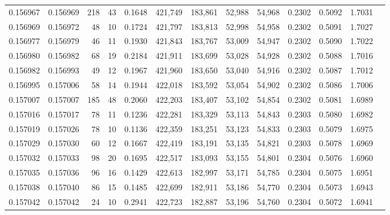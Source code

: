 \begin{tabular}{rrrrrrrrrrrrr}
0.156967 & 0.156969 &   218 &  43 &                                     0.1648 & 421,749 & 183,861 &  52,988 &  54,968 & 0.2302 & 0.5092 & 1.7031 \\
0.156969 & 0.156972 &    48 &  10 &                                     0.1724 & 421,797 & 183,813 &  52,998 &  54,958 & 0.2302 & 0.5091 & 1.7027 \\
0.156977 & 0.156979 &    46 &  11 &                                     0.1930 & 421,843 & 183,767 &  53,009 &  54,947 & 0.2302 & 0.5090 & 1.7022 \\
0.156980 & 0.156982 &    68 &  19 &                                     0.2184 & 421,911 & 183,699 &  53,028 &  54,928 & 0.2302 & 0.5088 & 1.7016 \\
0.156982 & 0.156993 &    49 &  12 &                                     0.1967 & 421,960 & 183,650 &  53,040 &  54,916 & 0.2302 & 0.5087 & 1.7012 \\
0.156995 & 0.157006 &    58 &  14 &                                     0.1944 & 422,018 & 183,592 &  53,054 &  54,902 & 0.2302 & 0.5086 & 1.7006 \\
0.157007 & 0.157007 &   185 &  48 &                                     0.2060 & 422,203 & 183,407 &  53,102 &  54,854 & 0.2302 & 0.5081 & 1.6989 \\
0.157016 & 0.157017 &    78 &  11 &                                     0.1236 & 422,281 & 183,329 &  53,113 &  54,843 & 0.2303 & 0.5080 & 1.6982 \\
0.157019 & 0.157026 &    78 &  10 &                                     0.1136 & 422,359 & 183,251 &  53,123 &  54,833 & 0.2303 & 0.5079 & 1.6975 \\
0.157029 & 0.157030 &    60 &  12 &                                     0.1667 & 422,419 & 183,191 &  53,135 &  54,821 & 0.2303 & 0.5078 & 1.6969 \\
0.157032 & 0.157033 &    98 &  20 &                                     0.1695 & 422,517 & 183,093 &  53,155 &  54,801 & 0.2304 & 0.5076 & 1.6960 \\
0.157035 & 0.157036 &    96 &  16 &                                     0.1429 & 422,613 & 182,997 &  53,171 &  54,785 & 0.2304 & 0.5075 & 1.6951 \\
0.157038 & 0.157040 &    86 &  15 &                                     0.1485 & 422,699 & 182,911 &  53,186 &  54,770 & 0.2304 & 0.5073 & 1.6943 \\
0.157042 & 0.157042 &    24 &  10 &                                     0.2941 & 422,723 & 182,887 &  53,196 &  54,760 & 0.2304 & 0.5072 & 1.6941 \\

\end{tabular}
